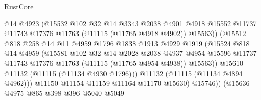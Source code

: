 \begin{lexlean}{RustCore}
\begin{coremodule}
                                @14
                                @4923
                                (@15532
                                  @102
                                  @32
                                  @14
                                  @3343
                                  @2038
                                  @4901
                                  @4918
                                  @15552
                                  @11737
                                  @11743
                                  @17376
                                  @11763
                                  (@11115 (@11765 @4918 @4902))
                                  @15563))
                              (@15512
                                @818
                                @258
                                @14
                                @11
                                @4959
                                @1796
                                @1838
                                @1913
                                @4929
                                @1919
                                (@15524
                                  @818
                                  @14
                                  @4959
                                  (@15581
                                    @102
                                    @32
                                    @14
                                    @2028
                                    @2038
                                    @4937
                                    @4954
                                    @15596
                                    @11737
                                    @11743
                                    @17376
                                    @11763
                                    (@11115 (@11765 @4954 @4938))
                                    @15563))
                                @15610
                                @11132
                                (@11115 (@11134 @4930 @1796)))
                              @11132
                              (@11115 (@11134 @4894 @4962)))
                            @11150
                            @11154
                            @11159
                            @11164
                            @11170
                            @15630)
                          @15746))
                      (@15636
                        @4975
                        @865
                        @398
                        @396
                        @5040
                        @5049

\end{coremodule}
\end{lexlean}
